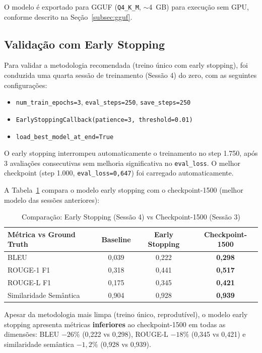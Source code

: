 O modelo é exportado para GGUF (\texttt{Q4\_K\_M}, $\sim$4~GB) para execução sem GPU, conforme descrito na Seção~\ref{subsec:gguf}.

\subsection{Validação com Early Stopping}
\label{subsec:early-stopping-resultados}

Para validar a metodologia recomendada (treino único com early stopping), foi conduzida uma quarta sessão de treinamento (Sessão 4) do zero, com as seguintes configurações:

\begin{itemize}
    \item \texttt{num\_train\_epochs=3}, \texttt{eval\_steps=250}, \texttt{save\_steps=250}
    \item \texttt{EarlyStoppingCallback(patience=3, threshold=0.01)}
    \item \texttt{load\_best\_model\_at\_end=True}
\end{itemize}

O early stopping interrompeu automaticamente o treinamento no step 1.750, após 3 avaliações consecutivas sem melhoria significativa no \texttt{eval\_loss}. O melhor checkpoint (step 1.000, \texttt{eval\_loss=0,647}) foi carregado automaticamente.

A Tabela~\ref{tab:early-stopping-vs-1500} compara o modelo early stopping com o checkpoint-1500 (melhor modelo das sessões anteriores):

\begin{table}[H]
\centering
\caption{Comparação: Early Stopping (Sessão 4) vs Checkpoint-1500 (Sessão 3)}
\label{tab:early-stopping-vs-1500}
\begin{tabular}{lccc}
\toprule
\textbf{Métrica vs Ground Truth} & \textbf{Baseline} & \textbf{Early Stopping} & \textbf{Checkpoint-1500} \\
\midrule
BLEU                      & 0,039 & 0,222 & \textbf{0,298} \\
ROUGE-1 F1                & 0,318 & 0,441 & \textbf{0,517} \\
ROUGE-L F1                & 0,175 & 0,345 & \textbf{0,421} \\
Similaridade Semântica    & 0,904 & 0,928 & \textbf{0,939} \\
\bottomrule
\end{tabular}
\end{table}

\begin{importantbox}
Apesar da metodologia mais limpa (treino único, reprodutível), o modelo early stopping apresenta métricas \textbf{inferiores} ao checkpoint-1500 em todas as dimensões: BLEU $-26\%$ (0,222 vs 0,298), ROUGE-L $-18\%$ (0,345 vs 0,421) e similaridade semântica $-1,2\%$ (0,928 vs 0,939).
\end{importantbox}

